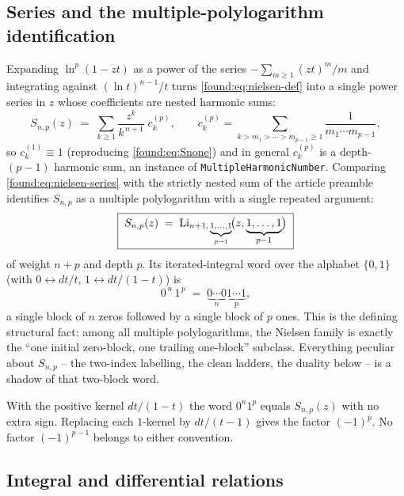 \subsection{Series and the multiple-polylogarithm identification}

Expanding $\ln^{p}(1-zt)$ as a power of the series $-\sum_{m\ge1}(zt)^m/m$ and integrating against $(\ln t)^{n-1}/t$ turns \eqref{found:eq:nielsen-def} into a single power series in $z$ whose coefficients are nested harmonic sums:
\begin{equation}\label{found:eq:nielsen-series}
  S_{n,p}(z)\;=\;\sum_{k\ge1}\frac{z^{k}}{k^{\,n+1}}\;c^{(p)}_{k},
  \qquad
  c^{(p)}_{k}=\sum_{k> m_1>\cdots> m_{p-1}\ge1}\frac{1}{m_1\cdots m_{p-1}} ,
\end{equation}
so $c^{(1)}_k\equiv1$ (reproducing \eqref{found:eq:Snone}) and in general $c^{(p)}_k$ is a depth-$(p-1)$ harmonic sum, an instance of \texttt{MultipleHarmonicNumber}. Comparing \eqref{found:eq:nielsen-series} with the strictly nested sum of the article preamble identifies $S_{n,p}$ as a multiple polylogarithm with a single repeated argument:
\begin{equation}\label{found:eq:nielsen-MPL}
  \boxed{\;S_{n,p}(z)\;=\;\operatorname{Li}_{n+1,\,\underbrace{\scriptstyle 1,\dots,1}_{p-1}}\!\bigl(z,\underbrace{1,\dots,1}_{p-1}\bigr)\;}
\end{equation}
of weight $n+p$ and depth $p$. Its iterated-integral word over the alphabet $\{0,1\}$ (with $0\leftrightarrow dt/t$, $1\leftrightarrow dt/(1-t)$) is
\[
  0^{\,n}\,1^{\,p}\;=\;\underbrace{0\cdots0}_{n}\underbrace{1\cdots1}_{p},
\]
a single block of $n$ zeros followed by a single block of $p$ ones. This is the defining structural fact: among all multiple polylogarithms, the Nielsen family is exactly the ``one initial zero-block, one trailing one-block'' subclass. Everything peculiar about $S_{n,p}$ -- the two-index labelling, the clean ladders, the duality below -- is a shadow of that two-block word.

\begin{remark}
With the positive kernel $dt/(1-t)$ the word $0^n1^p$ equals
$S_{n,p}(z)$ with no extra sign. Replacing each $1$-kernel by
$dt/(t-1)$ gives the factor $(-1)^p$. No factor $(-1)^{p-1}$
belongs to either convention.
\end{remark}

\subsection{Integral and differential relations}

